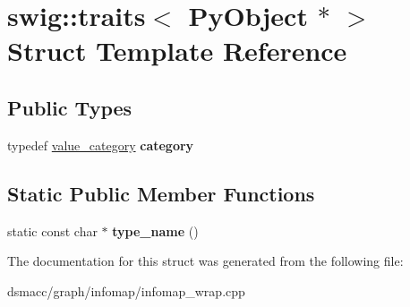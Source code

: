 \hypertarget{structswig_1_1traits_3_01PyObject_01_5_01_4}{}\section{swig\+:\+:traits$<$ Py\+Object $\ast$ $>$ Struct Template Reference}
\label{structswig_1_1traits_3_01PyObject_01_5_01_4}
\subsection*{Public Types}
\begin{DoxyCompactItemize}
\item 
\mbox{\label{structswig_1_1traits_3_01PyObject_01_5_01_4_a61e2b13476996b055b368fe035b84efc}} 
typedef \mbox{\hyperlink{structswig_1_1value__category}{value\+\_\+category}} {\bfseries category}
\end{DoxyCompactItemize}
\subsection*{Static Public Member Functions}
\begin{DoxyCompactItemize}
\item 
\mbox{\label{structswig_1_1traits_3_01PyObject_01_5_01_4_a0d02bab40318920cce95270a10e465cd}} 
static const char $\ast$ {\bfseries type\+\_\+name} ()
\end{DoxyCompactItemize}


The documentation for this struct was generated from the following file\+:\begin{DoxyCompactItemize}
\item 
dsmacc/graph/infomap/infomap\+\_\+wrap.\+cpp\end{DoxyCompactItemize}

